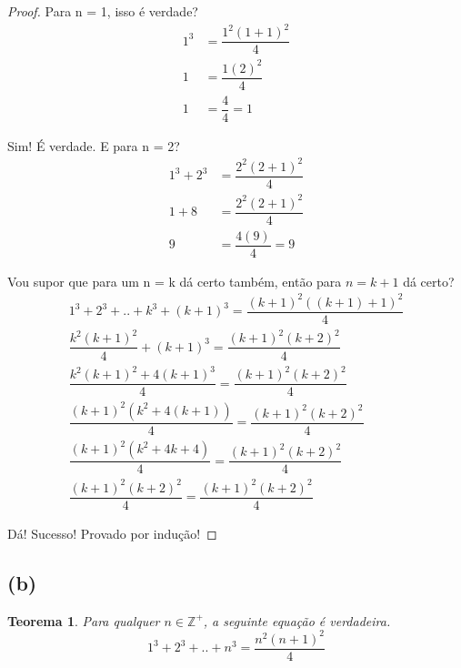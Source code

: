 \documentclass{article}
\begin{document}
\begin{proof}
	Para n = 1, isso é verdade?
\begin{equation}
\begin{split}
	1^3 & = \dfrac{1^2(1+1)^2}{4} \\
	1 & = \dfrac{1(2)^2}{4} \\
	1 & = \dfrac{4}{4} = 1
\end{split}
\end{equation}

	Sim! É verdade. E para n = 2?
\begin{equation}
\begin{split}
	1^3 + 2^3 & = \dfrac{2^2(2+1)^2}{4} \\
	1 + 8& = \dfrac{2^2(2+1)^2}{4} \\
	9 & = \dfrac{4(9)}{4} = 9
\end{split}
\end{equation}

	Vou supor que para um n = k dá certo também, então para $n = k + 1$ dá certo?
\begin{equation}
\begin{split}
	1^3 + 2^3 + .. + k^3 + (k+1)^3 = \dfrac{(k+1)^2((k+1)+1)^2}{4} \\
	\dfrac{k^2(k+1)^2}{4} + (k+1)^3 = \dfrac{ (k+1)^2(k+2)^2 }{ 4 } \\
	\dfrac{k^2(k+1)^2 + 4(k+1)^3}{4}  = \dfrac{ (k+1)^2(k+2)^2 }{ 4 } \\
	\dfrac{ (k+1)^2(k^2 + 4(k+1)) }{4}  = \dfrac{ (k+1)^2(k+2)^2 }{ 4 } \\
	\dfrac{ (k+1)^2(k^2 + 4k + 4) }{4}  = \dfrac{ (k+1)^2(k+2)^2 }{ 4 } \\
	\dfrac{ (k+1)^2(k + 2)^2 }{4}  = \dfrac{ (k+1)^2(k+2)^2 }{ 4 } 
\end{split}
\end{equation}

	Dá! Sucesso! Provado por indução!
\end{proof}


\subsection*{(b)}
\newtheorem{teo1}{Teorema}
\begin{teo1}
    Para qualquer $n \in  \mathbb{Z^+}$, a seguinte equação é verdadeira.
	\begin{equation}
		1^3 + 2^3 + .. + n^3 = \dfrac{n^2(n+1)^2}{4}
	\end{equation}	
\end{teo1}
\end{document}
